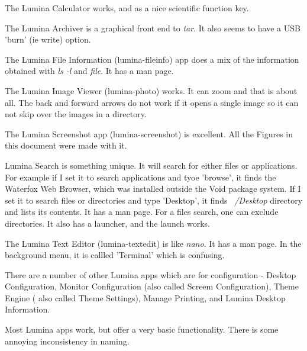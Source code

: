 \documentclass{article}  %
\begin{document}
{The Lumina Calculator works, and as a nice scientific function key. 

The Lumina Archiver is a graphical front end to {\em tar}. It also seems to have a USB 'burn' (ie write) option.

The Lumina File Information (lumina-fileinfo) app does a mix of the information obtained with {\em ls -l}  and {\em file}. It has a man page.

The Lumina Image Viewer (lumina-photo) works. It can zoom and that is about all. The back and forward arrows do not work if it opens a single image so it can not skip over the images in a directory.

The Lumina Screenshot app (lumina-screenshot) is excellent. All the Figures in this document were made with it. 

Lumina Search is something unique. It will search for either files or applications. For example if I set it to search applications and tyoe 'browse', it finds the Waterfox Web Browser, which was installed outside the Void package system. If I set it to search files or directories and type 'Desktop', it finds {\em ~/Desktop} directory and lists its contents. It has a man page. For a files search, one can exclude directories. It also has a launcher, and the launch works.

The Lumina Text Editor (lumina-textedit) is like {\em nano}. It has a man page. In the background menu, it is callled 'Terminal' which is confusing.

There are a number of other Lumina apps which are for configuration - Desktop Configuration, Monitor Configuration (also called Screem Configuration), Theme Engine ( also called Theme Settings), Manage Printing, and Lumina Desktop Information.

Most Lumina apps work, but offer a very basic functionality. There is some annoying inconsistency in naming.

}
\end{document}

